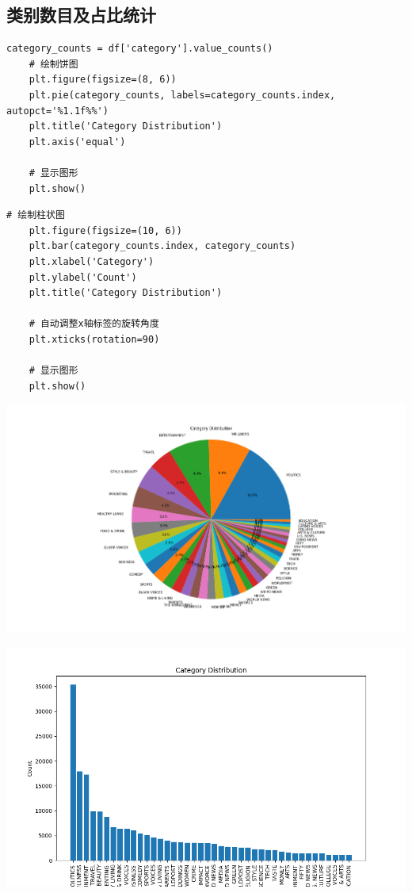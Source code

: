 \documentclass{article}
\begin{document}
\subsection{类别数目及占比统计}
\begin{lstlisting}
category_counts = df['category'].value_counts()
    # 绘制饼图
    plt.figure(figsize=(8, 6))
    plt.pie(category_counts, labels=category_counts.index, autopct='%1.1f%%')
    plt.title('Category Distribution')
    plt.axis('equal')

    # 显示图形
    plt.show()
\end{lstlisting}
\begin{lstlisting}
# 绘制柱状图
    plt.figure(figsize=(10, 6))
    plt.bar(category_counts.index, category_counts)
    plt.xlabel('Category')
    plt.ylabel('Count')
    plt.title('Category Distribution')

    # 自动调整x轴标签的旋转角度
    plt.xticks(rotation=90)

    # 显示图形
    plt.show()
\end{lstlisting}
\begin{center}
    \includegraphics[width=1\linewidth]{分类.png}
\end{center}
\begin{center}
    \includegraphics[width=1\linewidth]{类别柱状图.png}
\end{center}
\end{document}
